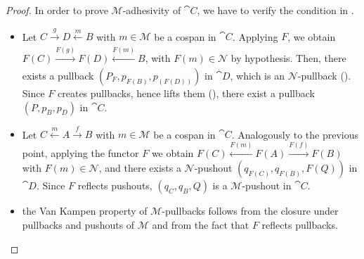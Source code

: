 \documentclass[a4paper, twoside,openright]{report}
\theoremstyle{plain}
\theoremstyle{definition}
\begin{document}
\begin{proof}
    In order to prove $\mathcal M$-adhesivity of $\cat C$, we have to verify the condition in .
    \begin{itemize}
        \item Let $C \xrightarrow[]{g} D \xleftarrow[]{m} B$ with $m \in \mathcal M$ be a cospan in $\cat C$. Applying $F$, we obtain $F(C) \xrightarrow[]{F(g)} F(D) \xleftarrow[]{F(m)} B$, with $F(m) \in \mathcal{N}$ by hypothesis. Then, there exists a pullback $(P_F, p_{F(B)}, p_{(F(D))})$ in $\cat D$, which is an $\mathcal N$-pullback (). Since $F$ creates pullbacks, hence lifts them (), there exist a pullback $(P, p_B, p_D)$ in $\cat C$.
        \item Let $C \xleftarrow{m} A \xrightarrow{f} B$ with $ m \in \mathcal M$ be a cospan in $\cat C$. Analogously to the previous point, applying the functor $F$ we obtain $F(C) \xleftarrow{F(m)} F(A) \xrightarrow{F(f)} F(B)$ with $ F(m) \in \mathcal N$, and there exists a $\mathcal N$-pushout $(q_{F(C)}, q_{F(B)}, F(Q))$ in $\cat D$. Since $F$ reflects pushouts, $(q_C, q_B, Q)$ is a $\mathcal{M}$-pushout in $\cat C$.
        \item the Van Kampen property of $\mathcal M$-pullbacks follows from the closure under pullbacks and pushouts of $\mathcal M$ and from the fact that $F$ reflects pullbacks.
    \end{itemize}
    
\end{proof}


{%









}
\end{document}
